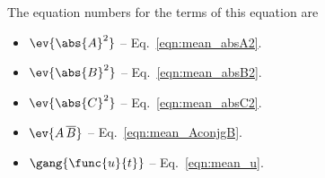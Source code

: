 The equation numbers for the terms of this equation are

\begin{itemize}
	\item [] $\ev{\abs{A}^2}$ -- Eq.~\ref{eqn:mean_absA2}.
	\item [] $\ev{\abs{B}^2}$ -- Eq.~\ref{eqn:mean_absB2}.
	\item [] $\ev{\abs{C}^2}$ -- Eq.~\ref{eqn:mean_absC2}.
	\item [] $\ev{A\,\overline{B}}$ -- Eq.~\ref{eqn:mean_AconjgB}.
	\item [] $\gang{\func{u}{t}}$ -- Eq.~\ref{eqn:mean_u}.
\end{itemize}

